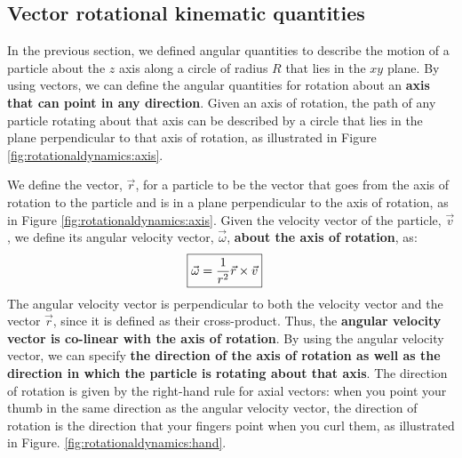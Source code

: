 \subsection{Vector rotational kinematic quantities}
In the previous section, we defined angular quantities to describe the motion of a particle about the $z$ axis along a circle of radius $R$ that lies in the $xy$ plane. By using vectors, we can define the angular quantities for rotation about an \textbf{axis that can point in any direction}. Given an axis of rotation, the path of any particle rotating about that axis can be described by a circle that lies in the plane perpendicular to that axis of rotation, as illustrated in Figure \ref{fig:rotationaldynamics:axis}.

We define the vector, $\vec r$, for a particle to be the vector that goes from the axis of rotation to the particle and is in a plane perpendicular to the axis of rotation, as in Figure \ref{fig:rotationaldynamics:axis}. Given the velocity vector of the particle, $\vec v$, we define its angular velocity vector, $\vec\omega$, \textbf{about the axis of rotation}, as:
\begin{align}
\Aboxed{\vec \omega = \frac{1}{r^2} \vec r \times \vec v}
\end{align}
The angular velocity vector is perpendicular to both the velocity vector and the vector $\vec r$, since it is defined as their cross-product. Thus, the \textbf{angular velocity vector is co-linear with the axis of rotation}. By using the angular velocity vector, we can specify \textbf{the direction of the axis of rotation as well as the direction in which the particle is rotating about that axis}. The direction of rotation is given by the right-hand rule for axial vectors: when you point your thumb in the same direction as the angular velocity vector, the direction of rotation is the direction that your fingers point when you curl them, as illustrated in Figure. \ref{fig:rotationaldynamics:hand}.


